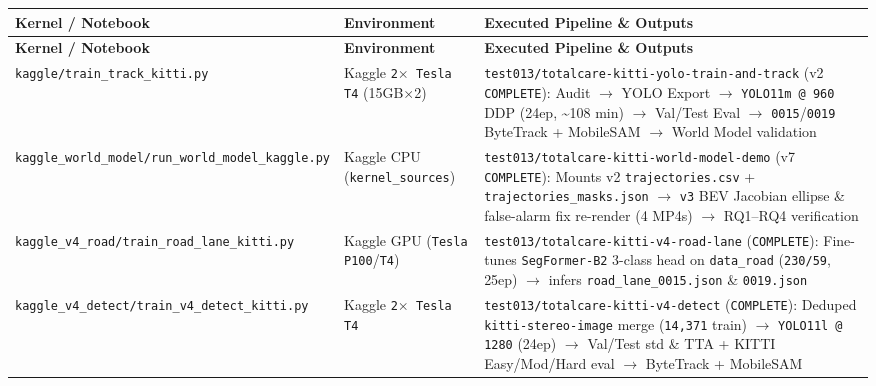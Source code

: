 \documentclass[10.5pt,a4paper]{article}
\begin{document}
\begin{footnotesize}
\setlength{\tabcolsep}{4pt}
\setlength{\LTleft}{0pt}\setlength{\LTright}{0pt}
\begin{longtable}{>{\raggedright\arraybackslash}p{} >{\raggedright\arraybackslash}p{} >{\raggedright\arraybackslash}p{}}
\toprule
\textbf{Kernel / Notebook} & \textbf{Environment} & \textbf{Executed Pipeline \& Outputs} \\
\midrule
\endfirsthead
\toprule
\textbf{Kernel / Notebook} & \textbf{Environment} & \textbf{Executed Pipeline \& Outputs} \\
\midrule
\endhead
\bottomrule
\endfoot
\texttt{kaggle/\allowbreak{}train\_\allowbreak{}track\_\allowbreak{}kitti.\allowbreak{}py} & Kaggle \texttt{2$\times$ Tesla T4} (15GB$\times$2) & \texttt{test013/\allowbreak{}totalcare-\allowbreak{}kitti-\allowbreak{}yolo-\allowbreak{}train-\allowbreak{}and-\allowbreak{}track} (v2 \texttt{COMPLETE}): Audit $\rightarrow$ YOLO Export $\rightarrow$ \texttt{YOLO11m @ 960} DDP (24ep, \textasciitilde{}108 min) $\rightarrow$ Val/Test Eval $\rightarrow$ \texttt{0015}/\texttt{0019} ByteTrack + MobileSAM $\rightarrow$ World Model validation \\
\texttt{kaggle\_\allowbreak{}world\_\allowbreak{}model/\allowbreak{}run\_\allowbreak{}world\_\allowbreak{}model\_\allowbreak{}kaggle.\allowbreak{}py} & Kaggle CPU (\texttt{kernel\_\allowbreak{}sources}) & \texttt{test013/\allowbreak{}totalcare-\allowbreak{}kitti-\allowbreak{}world-\allowbreak{}model-\allowbreak{}demo} (v7 \texttt{COMPLETE}): Mounts v2 \texttt{trajectories.\allowbreak{}csv} + \texttt{trajectories\_\allowbreak{}masks.\allowbreak{}json} $\rightarrow$ \texttt{v3} BEV Jacobian ellipse \& false-alarm fix re-render (4 MP4s) $\rightarrow$ RQ1--RQ4 verification \\
\texttt{kaggle\_\allowbreak{}v4\_\allowbreak{}road/\allowbreak{}train\_\allowbreak{}road\_\allowbreak{}lane\_\allowbreak{}kitti.\allowbreak{}py} & Kaggle GPU (\texttt{Tesla P100}/\texttt{T4}) & \texttt{test013/\allowbreak{}totalcare-\allowbreak{}kitti-\allowbreak{}v4-\allowbreak{}road-\allowbreak{}lane} (\texttt{COMPLETE}): Fine-tunes \texttt{SegFormer-\allowbreak{}B2} 3-class head on \texttt{data\_\allowbreak{}road} (\texttt{230/\allowbreak{}59}, 25ep) $\rightarrow$ infers \texttt{road\_\allowbreak{}lane\_\allowbreak{}0015.\allowbreak{}json} \& \texttt{0019.\allowbreak{}json} \\
\texttt{kaggle\_\allowbreak{}v4\_\allowbreak{}detect/\allowbreak{}train\_\allowbreak{}v4\_\allowbreak{}detect\_\allowbreak{}kitti.\allowbreak{}py} & Kaggle \texttt{2$\times$ Tesla T4} & \texttt{test013/\allowbreak{}totalcare-\allowbreak{}kitti-\allowbreak{}v4-\allowbreak{}detect} (\texttt{COMPLETE}): Deduped \texttt{kitti-\allowbreak{}stereo-\allowbreak{}image} merge (\texttt{14,\allowbreak{}371} train) $\rightarrow$ \texttt{YOLO11l @ 1280} (24ep) $\rightarrow$ Val/Test std \& TTA + KITTI Easy/Mod/Hard eval $\rightarrow$ ByteTrack + MobileSAM \\

\end{longtable}
\end{footnotesize}
\end{document}
